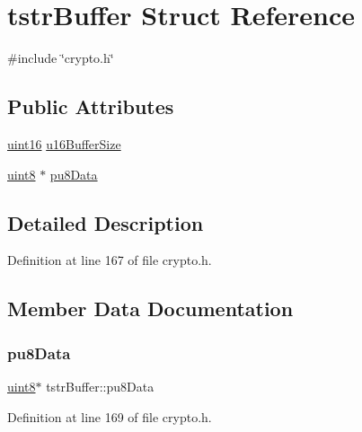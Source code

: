 \hypertarget{structtstrBuffer}{}\section{tstr\+Buffer Struct Reference}
\label{structtstrBuffer}


{\ttfamily \#include \char`\"{}crypto.\+h\char`\"{}}

\subsection*{Public Attributes}
\begin{DoxyCompactItemize}
\item 
\hyperlink{group__DataT_ga1daa745171fc6e31d942c161422a76f9}{uint16} \hyperlink{structtstrBuffer_abb8a6d4939c963003460e16e6b8a8243}{u16\+Buffer\+Size}
\item 
\hyperlink{group__DataT_ga4df709a77647e870bbf1d955b8edc9a6}{uint8} $\ast$ \hyperlink{structtstrBuffer_a27c72a3c54c0d1239ff7a2b9e32299b5}{pu8\+Data}
\end{DoxyCompactItemize}


\subsection{Detailed Description}


Definition at line 167 of file crypto.\+h.



\subsection{Member Data Documentation}
\mbox{\label{structtstrBuffer_a27c72a3c54c0d1239ff7a2b9e32299b5}} 
\subsubsection{\texorpdfstring{pu8\+Data}{pu8Data}}
{\footnotesize\ttfamily \hyperlink{group__DataT_ga4df709a77647e870bbf1d955b8edc9a6}{uint8}$\ast$ tstr\+Buffer\+::pu8\+Data}



Definition at line 169 of file crypto.\+h.

\mbox{\label{structtstrBuffer_abb8a6d4939c963003460e16e6b8a8243}} 
